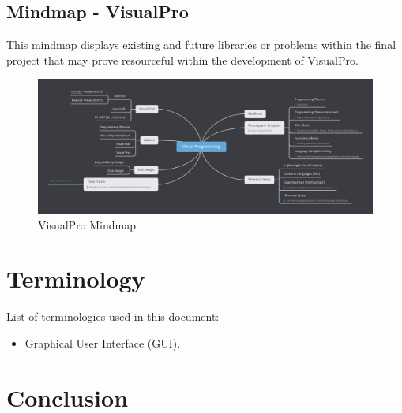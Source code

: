\documentclass[conference]{IEEEtran}
\begin{document}
      \begin{landscape}
        \thispagestyle{fancylandscape}
        \subsection{Mindmap - VisualPro}
        This mindmap displays existing and future libraries or problems within the final project that may prove resourceful within the development of VisualPro.
        \begin{figure}[h]
          \includegraphics[height=.83\textheight, width=1.30\textwidth]{Figures/mindmap-vp.png}
          \caption{VisualPro Mindmap}
        \end{figure}
      \end{landscape}

    \section{Terminology}
      List of terminologies used in this document:-
      \begin{itemize}
        \item Graphical User Interface (GUI).
      \end{itemize}
    \section{Conclusion}
    
	\nocite{*}
	\renewcommand\refname{\section{Reference List}}
	\small{
    }
\end{document}
